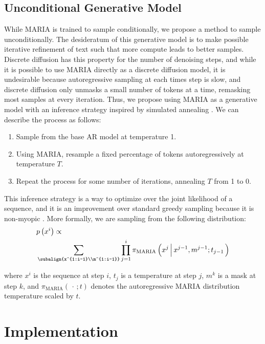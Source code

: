 \subsection*{Unconditional Generative Model}
While MARIA is trained to sample conditionally, we propose a method to sample unconditionally. The desideratum of this generative model is to make possible iterative refinement of text such that more compute leads to better samples. Discrete diffusion has this property for the number of denoising steps, and while it is possible to use MARIA directly as a discrete diffusion model, it is undesirable because autoregressive sampling at each times step is slow, and discrete diffusion only unmasks a small number of tokens at a time, remasking most samples at every iteration. Thus, we propose using MARIA as a generative model with an inference strategy inspired by simulated annealing \cite{bertsimas1993simulated}. We can describe the process as follows:
\begin{enumerate}
    \item Sample from the base AR model at temperature 1.
    \item Using MARIA, resample a fixed percentage of tokens autoregressively at temperature $T$.
    \item Repeat the process for some number of iterations, annealing $T$ from 1 to 0.
\end{enumerate}
This inference strategy is a way to optimize over the joint likelihood of a sequence, and it is an improvement over standard greedy sampling because it is non-myopic \cite{shih2023long}. More formally, we are sampling from the following distribution:
\begin{align*}
    &p\left(x^{i}\right)\propto\\
    &\sum_{\subalign{x^{1:i-1}\\m^{1:i-1}}}\prod_{j=1}^i  \pi_{\mathrm{MARIA}}\left(x^{j}\,\Big|\, x^{j-1},m^{j-1} ; t_{j-1} \,\right)
\end{align*}

where $x^{i}$ is the sequence at step $i$, $t_j$ is a temperature at step $j$, $m^{k}$ is a mask at step $k$, and $\pi_{\mathrm{MARIA}}(\,\cdot \,; t)$ denotes the autoregressive MARIA distribution temperature scaled by $t$.

\section*{Implementation}
